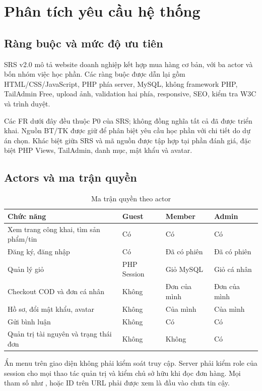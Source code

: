 \section{Phân tích yêu cầu hệ thống}
\label{sec:requirements}
\subsection{Ràng buộc và mức độ ưu tiên}
SRS v2.0 mô tả website doanh nghiệp kết hợp mua hàng cơ bản, với ba actor và bốn nhóm việc học phần. Các ràng buộc được dẫn lại gồm HTML/CSS/JavaScript, PHP phía server, MySQL, không framework PHP, TailAdmin Free, upload ảnh, validation hai phía, responsive, SEO, kiểm tra W3C và trình duyệt.\cite{srs}

Các FR dưới đây đều thuộc P0 của SRS; không đồng nghĩa tất cả đã được triển khai. Nguồn BT/TK được giữ để phân biệt yêu cầu học phần với chi tiết do dự án chọn. Khác biệt giữa SRS và mã nguồn được tập hợp tại phần đánh giá, đặc biệt PHP Views, TailAdmin, danh mục, mật khẩu và avatar.

\subsection{Actors và ma trận quyền}
\begin{table}[H]\centering
\caption{Ma trận quyền theo actor}\label{tab:permissions}
\begin{tabularx}{\linewidth}{@{}YP{2.0cm}P{2.5cm}P{2.5cm}@{}}\toprule
Chức năng & Guest & Member & Admin\\ \midrule
Xem trang công khai, tìm sản phẩm/tin & Có & Có & Có\\
Đăng ký, đăng nhập & Có & Đã có phiên & Đã có phiên\\
Quản lý giỏ & PHP Session & Giỏ MySQL & Giỏ cá nhân\\
Checkout COD và đơn cá nhân & Không & Đơn của mình & Đơn của mình\\
Hồ sơ, đổi mật khẩu, avatar & Không & Của mình & Của mình\\
Gửi bình luận & Không & Có & Có\\
Quản trị tài nguyên và trạng thái đơn & Không & Không & Có\\
\bottomrule\end{tabularx}
\end{table}

Ẩn menu trên giao diện không phải kiểm soát truy cập. Server phải kiểm role của session cho mọi thao tác quản trị và kiểm chủ sở hữu khi đọc đơn hàng. Mọi tham số như ,  hoặc ID trên URL phải được xem là đầu vào chưa tin cậy.

